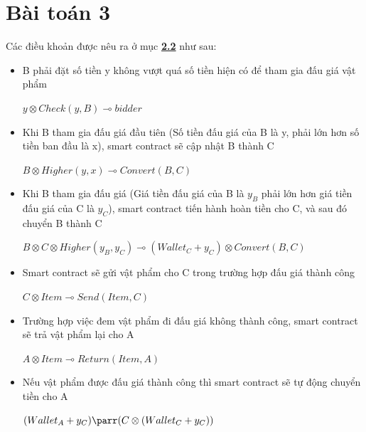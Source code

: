 \documentclass[a4paper]{article}
\begin{document}
\section{Bài toán 3}
Các điều khoản được nêu ra ở mục \hyperref[dieukhoan]{\textbf{2.2}} như sau:
\begin{itemize}
    \item B phải đặt số tiền y không vượt quá số tiền hiện có để tham gia đấu giá vật phẩm\\
    \begin{center}
        $y \otimes Check(y,B) \multimap bidder$
    \end{center}
    
    \item Khi B tham gia đấu giá đầu tiên (Số tiền đấu giá của B là y, phải lớn hơn số tiền ban đầu là x), smart contract sẽ cập nhật B thành C\\
    \begin{center}
        $B \otimes Higher(y,x) \multimap Convert(B, C)$
    \end{center}
    
    \item Khi B tham gia đấu giá (Giá tiền đấu giá của B là $y_{B}$ phải lớn hơn giá tiền đấu giá của C là $y_{C}$), smart contract tiến hành hoàn tiền cho C, và sau đó chuyển B thành C\\
    \begin{center}
        $B \otimes C \otimes Higher(y_{B}, y_{C}) \multimap (Wallet_{C} + y_{C}) \otimes Convert(B,C)$
    \end{center}
    
    \item Smart contract sẽ gửi vật phẩm cho C trong trường hợp đấu giá thành công\\
    \begin{center}
        $C \otimes Item \multimap Send(Item,C)$
    \end{center}
    
    \item Trường hợp việc đem vật phẩm đi đấu giá không thành công, smart contract sẽ trả vật phẩm lại cho A\\
    \begin{center}
        $A \otimes Item \multimap Return(Item,A)$
    \end{center}
    
    \item Nếu vật phẩm được đấu giá thành công thì smart contract sẽ tự động chuyển tiền cho A\\
    \begin{center}
        $(Wallet_{A} + y_{C}) \parr (C \otimes (Wallet_{C} + y_{C}))$
    \end{center}
    

\end{itemize}
\end{document}
